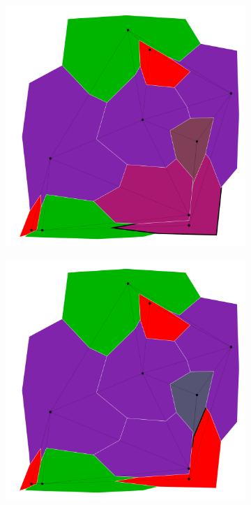 \documentclass{article}
\begin{document}
\begin{figure}[h!]
\begin{subfigure}{0.18\textwidth}
				\caption{}
			\end{subfigure}
			\;
			\begin{subfigure}{0.18\textwidth}
				\centering
				\includegraphics[width=\textwidth]{images/sequences/forward_backtracking/bt_forward_I00009}
				\caption{}
			\end{subfigure}
			\;
			\begin{subfigure}{0.18\textwidth}
				\centering
				\includegraphics[width=\textwidth]{images/sequences/forward_backtracking/bt_forward_I00011}
				\caption{}
			\end{subfigure} \\
			

\end{figure}
\end{document}
